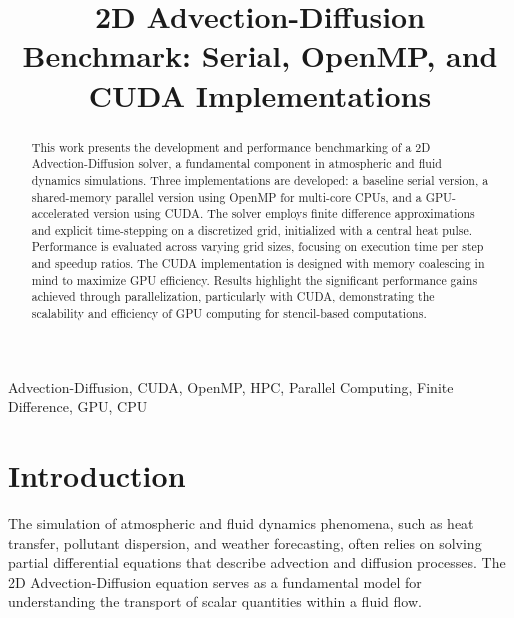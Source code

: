 \documentclass[conference]{IEEEtran}
\begin{document}
\title{2D Advection-Diffusion Benchmark: Serial, OpenMP, and CUDA Implementations}

\author{
\and
{}
}

\maketitle

\begin{abstract}
This work presents the development and performance benchmarking of a 2D Advection-Diffusion solver, a fundamental component in atmospheric and fluid dynamics simulations. Three implementations are developed: a baseline serial version, a shared-memory parallel version using OpenMP for multi-core CPUs, and a GPU-accelerated version using CUDA. The solver employs finite difference approximations and explicit time-stepping on a discretized grid, initialized with a central heat pulse. Performance is evaluated across varying grid sizes, focusing on execution time per step and speedup ratios. The CUDA implementation is designed with memory coalescing in mind to maximize GPU efficiency. Results highlight the significant performance gains achieved through parallelization, particularly with CUDA, demonstrating the scalability and efficiency of GPU computing for stencil-based computations.
\end{abstract}

\begin{IEEEkeywords}
Advection-Diffusion, CUDA, OpenMP, HPC, Parallel Computing, Finite Difference, GPU, CPU
\end{IEEEkeywords}

\section{Introduction}

The simulation of atmospheric and fluid dynamics phenomena, such as heat transfer, pollutant dispersion, and weather forecasting, often relies on solving partial differential equations that describe advection and diffusion processes. The 2D Advection-Diffusion equation serves as a fundamental model for understanding the transport of scalar quantities within a fluid flow.
\end{document}
